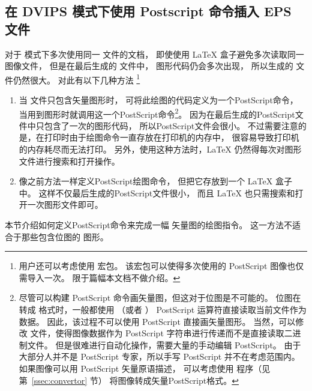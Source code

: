 \subsection{在 DVIPS 模式下使用 Postscript 命令插入 EPS 文件}\label{ssec:defps}

对于  模式下多次使用同一  文件的文档，
即使使用 \LaTeX{} 盒子避免多次读取同一图像文件，
但是在最后生成的 文件中， 图形代码仍会多次出现，
所以生成的  文件仍然很大。
对此有以下几种方法 \footnote{
	用户还可以考虑使用  宏包。
	该宏包可以使得多次使用的 PostScript 图像也仅需导入一次。
	限于篇幅本文档不做介绍。}
\begin{enumerate}
	\item 当  文件只包含矢量图形时，
	可将此绘图的代码定义为一个PostScript命令，
	当用到图形时就调用这一个PostScript命令\footnote{
		尽管可以构建 PostScript 命令画矢量图，但这对于位图是不可能的。
		位图在转成  格式时，一般都使用  （或者 ） PostScript 运算符直接读取当前文件作为数据。
		因此，该过程不可以使用 PostScript 直接画矢量图形。
		当然，可以修改  文件，使得图像数据作为 PostScript 字符串进行传递而不是直接读取二进制文件。
		但是很难进行自动化操作，需要大量的手动编辑 PostScript。
		由于大部分人并不是 PostScript 专家，所以手写 PostScript 并不在考虑范围内。
		如果图像可以用 PostScript 矢量原语描述，
		可以考虑使用  程序（见第~\ref{ssec:convertor} 节） 将图像转成矢量PostScript格式。}。
	因为在最后生成的PostScript文件中只包含了一次的图形代码，
	所以PostScript文件会很小。
	不过需要注意的是，在打印时由于绘图命令一直存放在打印机的内存中，
	很容易导致打印机的内存耗尽而无法打印。
	另外，使用这种方法时，\LaTeX{} 仍然得每次对图形文件进行搜索和打开操作。
	\item 像之前方法一样定义PostScript绘图命令，
	但把它存放到一个 \LaTeX{} 盒子中。
	这样不仅最后生成的PostScript文件很小，
	而且 \LaTeX{} 也只需搜索和打开一次图形文件即可。
\end{enumerate}

本节介绍如何定义PostScript命令来完成一幅  矢量图的绘图指令。
这一方法不适合于那些包含位图的  图形。

